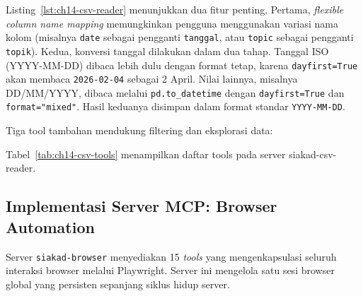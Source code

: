 \noindent Listing~\ref{lst:ch14-csv-reader} menunjukkan dua fitur penting. Pertama, \textit{flexible column name mapping} memungkinkan pengguna menggunakan variasi nama kolom (misalnya \texttt{date} sebagai pengganti \texttt{tanggal}, atau \texttt{topic} sebagai pengganti \texttt{topik}). Kedua, konversi tanggal dilakukan dalam dua tahap. Tanggal ISO (YYYY-MM-DD) dibaca lebih dulu dengan format tetap, karena \texttt{dayfirst=True} akan membaca \texttt{2026-02-04} sebagai 2 April. Nilai lainnya, misalnya DD/MM/YYYY, dibaca melalui \texttt{pd.to\_datetime} dengan \texttt{dayfirst=True} dan \texttt{format="mixed"}. Hasil keduanya disimpan dalam format standar \texttt{YYYY-MM-DD}.

Tiga tool tambahan mendukung filtering dan eksplorasi data:


Tabel~\ref{tab:ch14-csv-tools} menampilkan daftar tools pada server siakad-csv-reader.
\begin{table}[h]
\centering
\caption{Daftar tools pada server \texttt{siakad-csv-reader}}
\label{tab:ch14-csv-tools}
\footnotesize
{}
\normalsize
\end{table}

\subsection{Implementasi Server MCP: Browser Automation}

Server \texttt{siakad-browser} menyediakan 15 \textit{tools} yang mengenkapsulasi seluruh interaksi browser melalui Playwright. Server ini mengelola satu sesi browser global yang persisten sepanjang siklus hidup server.

